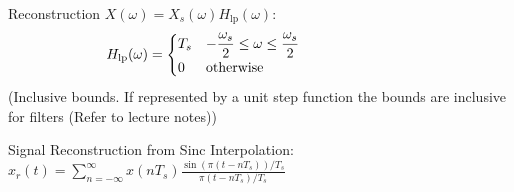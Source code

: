 \documentclass[12pt,landscape,letterpaper]{article}
\newcommand{\tab}{\hspace{0.02\textwidth}}
\newcommand{\ds}{\displaystyle}
\begin{document}
\begin{multicols*}{3}
Reconstruction $X(\omega)=X_s(\omega)H_\text{lp}(\omega)$:
\vspace{-1em}
\begin{equation*}
\hspace{-8em}
H_{\text{lp}}(\omega) =
\begin{cases}
T_s & \ds -\frac{\omega_s}{2} \leq \omega \leq \frac{\omega_s}{2}\\
0 & \text{otherwise}
\end{cases}
\end{equation*}
\tab (Inclusive bounds. If represented by a unit step function the bounds are inclusive for filters (Refer to lecture notes))

Signal Reconstruction from Sinc Interpolation:\\
\tab $\ds x_r(t) = \sum_{n=-\infty}^{\infty} x(nT_s) \frac{\sin(\pi(t-nT_s))/T_s}{\pi(t-nT_s)/T_s}$
\end{multicols*}

\newpage
\end{document}
